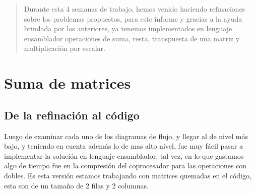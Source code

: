 \documentclass[conference]{IEEEtran}
\begin{document}
\begin{abstract}
Durante esta 4 semanas de trabajo, hemos venido haciendo
refinaciones sobre los problemas propuestos, para este informe y gracias a la ayuda
brindada por los anteriores, ya tenemos implementados en lenguaje ensamblador
 operaciones de suma, resta, transpuesta de una matriz y multiplicación por escalar.
\end{abstract}





%
\thispagestyle{fancy}
\IEEEpeerreviewmaketitle



\section{Suma de matrices}



\subsection{De la refinaci\'on al c\'odigo}
Luego de examinar cada uno de los diagramas de flujo, y llegar al de nivel m\'as
bajo, y teniendo en cuenta adem\'as lo de mas alto nivel, fue muy f\'acil pasar a
implementar la soluci\'on en lenguaje ensamblador, tal vez, en lo que gastamos algo de tiempo fue en la compresi\'on del coprocesador para las operaciones con dobles. Es esta versi\'on estamos trabajando con matrices quemadas en el c\'odigo, esta son de un tamaño de 2 filas y 2 columnas.
\end{document}

